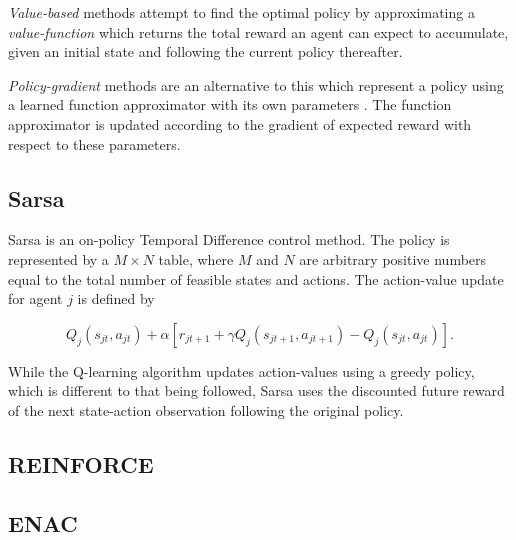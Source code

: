 \textit{Value-based} methods attempt to find the optimal policy by
approximating a \textit{value-function} which returns the total reward an
agent can expect to accumulate, given an initial state and following the
current policy thereafter.

\textit{Policy-gradient} methods are an alternative to this which
represent a policy using a learned function approximator with its own
parameters \cite{Sutton99policygradient}.  The function approximator is updated
according to the gradient of expected reward with respect to these parameters.

\subsection{Sarsa}
Sarsa is an on-policy Temporal Difference control method.  The
policy is represented by a $M \times N$ table, where $M$ and $N$ are
arbitrary positive numbers equal to the total number of feasible states and
actions. The action-value update for agent $j$ is defined by

\begin{equation}
Q_j(s_{jt},a_{jt}) + \alpha [r_{jt+1} + \gamma Q_j(s_{jt+1},a_{jt+1}) -
Q_j(s_{jt},a_{jt})].
\end{equation}

While the Q-learning algorithm updates action-values using a greedy policy,
which is different to that being followed, Sarsa uses the discounted future
reward of the next state-action observation following the original policy.

\subsection{REINFORCE}
\label{sec:reinforce}

\subsection{ENAC}
\label{sec:enac}
